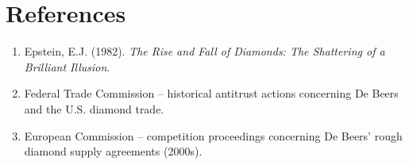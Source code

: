 \section*{References}
\begin{enumerate}
  \item Epstein, E.J. (1982). \textit{The Rise and Fall of Diamonds: The Shattering of a Brilliant Illusion}.
  \item Federal Trade Commission -- historical antitrust actions concerning De Beers and the U.S. diamond trade.
  \item European Commission -- competition proceedings concerning De Beers' rough diamond supply agreements (2000s).
\end{enumerate}


